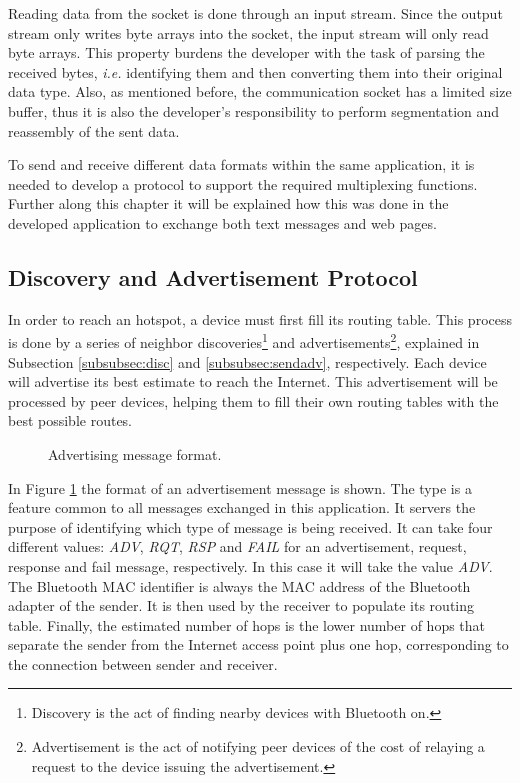 Reading data from the socket is done through an input stream. Since the output stream only writes byte arrays into the socket, the input stream will only read byte arrays. This property burdens the developer with the task of parsing the received bytes, \textit{i.e.} identifying them and then converting them into their original data type. Also, as mentioned before, the communication socket has a limited size buffer, thus it is also the developer's responsibility to perform segmentation and reassembly of the sent data.

To send and receive different data formats within the same application, it is needed to develop a protocol to support the required multiplexing functions. Further along this chapter it will be explained how this was done in the developed application to exchange both text messages and web pages.

\subsection{Discovery and Advertisement Protocol}
\label{subsec:disandadv}

In order to reach an hotspot, a device must first fill its routing table. This process is done by a series of neighbor discoveries\footnote{Discovery is the act of finding nearby devices with Bluetooth on.} and advertisements\footnote{Advertisement is the act of notifying peer devices of the cost of relaying a request to the device issuing the advertisement.}, explained in Subsection \ref{subsubsec:disc} and \ref{subsubsec:sendadv}, respectively. Each device will advertise its best estimate to reach the Internet. This advertisement will be processed by peer devices, helping them to fill their own routing tables with the best possible routes.

\begin{figure}[ht]
   \noindent{}
	\caption{\label{fig:advmsg} Advertising message format.}
\end{figure}

In Figure \ref{fig:advmsg} the format of an advertisement message is shown. The type is a feature common to all messages exchanged in this application. It servers the purpose of identifying which type of message is being received. It can take four different values: \textit{ADV}, \textit{RQT}, \textit{RSP} and \textit{FAIL} for an advertisement, request, response and fail message, respectively. In this case it will take the value \textit{ADV}. The Bluetooth \gls{MAC} identifier is always the \gls{MAC} address of the Bluetooth adapter of the sender. It is then used by the receiver to populate its routing table. Finally, the estimated number of hops is the lower number of hops that separate the sender from the Internet access point plus one hop, corresponding to the connection between sender and receiver.

